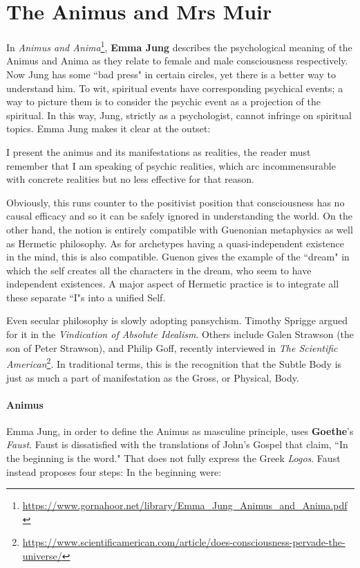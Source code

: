 \section{The Animus and Mrs Muir}

In \emph{Animus and Anima}\footnote{\url{https://www.gornahoor.net/library/Emma_Jung_Animus_and_Anima.pdf}}, \textbf{Emma Jung} describes the psychological meaning of the Animus and Anima as they relate to female and male consciousness respectively. Now Jung has some ``bad press" in certain circles, yet there is a better way to understand him. To wit, spiritual events have corresponding psychical events; a way to picture them is to consider the psychic event as a projection of the spiritual. In this way, Jung, strictly as a psychologist, cannot infringe on spiritual topics. Emma Jung makes it clear at the outset:

\begin{quotex}
I present the animus and its manifestations as realities, the reader must remember that I am speaking of psychic realities, which arc incommensurable with concrete realities but no less effective for that reason. 

\end{quotex}
Obviously, this runs counter to the positivist position that consciousness has no causal efficacy and so it can be safely ignored in understanding the world. On the other hand, the notion is entirely compatible with Guenonian metaphysics as well as Hermetic philosophy. As for archetypes having a quasi-independent existence in the mind, this is also compatible. Guenon gives the example of the ``dream" in which the self creates all the characters in the dream, who seem to have independent existences. A major aspect of Hermetic practice is to integrate all these separate ``I"s into a unified Self.

Even secular philosophy is slowly adopting pansychism. Timothy Sprigge argued for it in the \emph{Vindication of Absolute Idealism}. Others include Galen Strawson (the son of Peter Strawson), and Philip Goff, recently interviewed in \textit{The Scientific American}\footnote{\url{https://www.scientificamerican.com/article/does-consciousness-pervade-the-universe/}}. In traditional terms, this is the recognition that the Subtle Body is just as much a part of manifestation as the Gross, or Physical, Body.

\paragraph{Animus}
Emma Jung, in order to define the Animus as masculine principle, uses \textbf{Goethe}'s \emph{Faust}. Faust is dissatisfied with the translations of John's Gospel that claim, ``In the beginning is the word." That does not fully express the Greek \emph{Logos}. Faust instead proposes four steps: In the beginning were:

